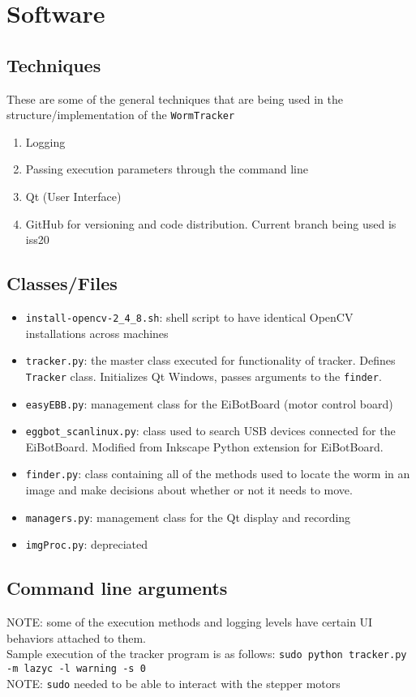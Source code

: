 \documentclass[fullpage]{report}
\begin{document}
\section{Software}
\subsection{Techniques}
These are some of the general techniques that are being used in the structure/implementation of the \verb|WormTracker|
\begin{enumerate}
\item Logging
\item Passing execution parameters through the command line
\item Qt (User Interface)
\item GitHub for versioning and code distribution. Current branch being used is iss20
\end{enumerate}
\subsection{Classes/Files}
\begin{itemize}
\item \verb|install-opencv-2_4_8.sh|: shell script to have identical OpenCV installations across machines
\item \verb|tracker.py|: the master class executed for functionality of tracker. Defines \verb|Tracker| class. Initializes Qt Windows, passes arguments to the \verb|finder|.
\item \verb|easyEBB.py|: management class for the EiBotBoard (motor control board)
\item \verb|eggbot_scanlinux.py|: class used to search USB devices connected for the EiBotBoard. Modified from Inkscape Python extension for EiBotBoard.
\item \verb|finder.py|: class containing all of the methods used to locate the worm in an image and make decisions about whether or not it needs to move. 
\item \verb|managers.py|: management class for the Qt display and recording
\item \verb|imgProc.py|: depreciated


\end{itemize}

\subsection{Command line arguments}
NOTE: some of the execution methods and logging levels have certain UI behaviors attached to them. \\
\noindent
Sample execution of the tracker program is as follows: \vspace{5 mm}
\verb|sudo python tracker.py -m lazyc -l warning -s 0|\\
\vspace{5mm}\noindent
NOTE: \verb|sudo| needed to be able to interact with the stepper motors
\end{document}
